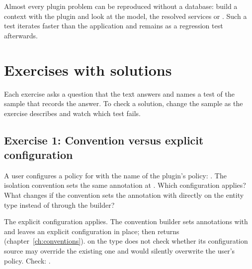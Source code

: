 \begin{tip}
  Almost every plugin problem can be reproduced without a database: build a context with the
  plugin and look at the model, the resolved services or
  . Such a test iterates faster
  than the application and remains as a regression test afterwards.
\end{tip}

\chapter{Exercises with solutions}\label{app:E}

Each exercise asks a question that the text answers and names a test of the sample that records
the answer. To check a solution, change the sample as the exercise describes and watch which test
fails.

\section{Exercise 1: Convention versus explicit configuration}

A user configures a policy for  with the name of the plugin's policy:
. The isolation
convention sets the same annotation at . Which configuration
applies? What changes if the convention sets the annotation with
 directly on the entity type instead of through the builder?

\begin{note}[Solution]
  The explicit configuration applies. The convention builder sets annotations with
   and leaves an explicit
  configuration in place;  then returns 
  (chapter~\ref{ch:conventions}).  on the type does not check
  whether its configuration source may override the existing one and would silently overwrite the user's policy.
  Check: .
\end{note}

